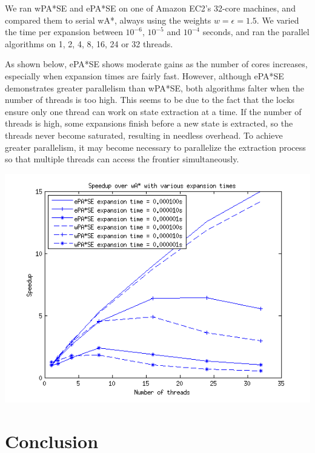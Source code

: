 \documentclass[letterpaper]{article}
\begin{document}
We ran wPA*SE and ePA*SE on one of Amazon EC2's 32-core machines, and compared them to serial wA*, always using the weights $w = \epsilon = 1.5$. We varied the time per expansion between $10^{-6}$, $10^{-5}$ and $10^{-4}$ seconds, and ran the parallel algorithms on 1, 2, 4, 8, 16, 24 or 32 threads.

As shown below, ePA*SE shows moderate gains as the number of cores increases, especially when expansion times are fairly fast. However, although ePA*SE demonstrates greater parallelism than wPA*SE, both algorithms falter when the number of threads is too high. This seems to be due to the fact that the locks ensure only one thread can work on state extraction at a time. If the number of threads is high, some expansions finish before a new state is extracted, so the threads never become saturated, resulting in needless overhead. To achieve greater parallelism, it may become necessary to parallelize the extraction process so that multiple threads can access the frontier simultaneously.

\includegraphics[scale=0.5]{time_sweep_all.png}

\section{Conclusion}



\end{document}
